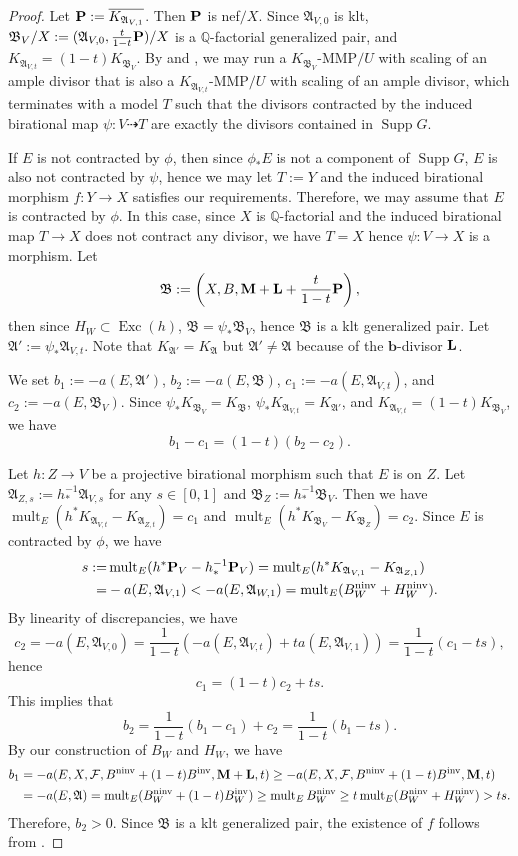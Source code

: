 \documentclass[12pt]{amsart}
\numberwithin{equation}{section}
\newcommand{\bb}{\bm{b}}
\newcommand{\Mm}{{\bf{M}}}
\newcommand{\Pp}{{\bf{P}}}
\newcommand{\Exc}{\operatorname{Exc}}
\newcommand{\ninv}{\operatorname{ninv}}
\newcommand{\inv}{\operatorname{inv}}
\newcommand{\Supp}{\operatorname{Supp}}
\newcommand{\mult}{\operatorname{mult}}
\newcommand{\Aa}{{\mathfrak{A}}}
\newcommand{\Bb}{{\mathfrak{B}}}
\newcommand{\Ff}{\mathcal{F}}
\newcommand{\Ll}{{\bf{L}}}
\theoremstyle{definition}
\theoremstyle{definition}
\theoremstyle{definition}
\begin{document}
\begin{proof}
Let $\Pp:=\overline{K_{\Aa_{V,1}}}$. Then $\Pp$ is nef$/X$. Since $\Aa_{V,0}$ is klt, $\Bb_{V}/X:=(\Aa_{V,0},\frac{t}{1-t}\Pp)/X$ is a $\mathbb Q$-factorial generalized pair, and $K_{\Aa_{V,t}}=(1-t)K_{\Bb_V}.$ By \cite[Lemma 4.4]{BZ16} and \cite[Lemma 3.3]{Bir12}, we may run a $K_{\Bb_V}$-MMP$/U$ with scaling of an ample divisor that is also a $K_{\Aa_{V,t}}$-MMP$/U$ with scaling of an ample divisor, which terminates with a model $T$ such that the divisors contracted by the induced birational map $\psi: V\dashrightarrow T$ are exactly the divisors contained in $\Supp G$.

If $E$ is not contracted by $\phi$, then since $\phi_*E$ is not a component of $\Supp G$, $E$ is also not contracted by $\psi$, hence we may let $T:=Y$ and the induced birational morphism $f: Y\rightarrow X$ satisfies our requirements. Therefore, we may assume that $E$ is contracted by $\phi$. In this case, since $X$ is $\mathbb Q$-factorial and the induced birational map $T\rightarrow X$ does not contract 
any divisor, we have $T=X$ hence $\psi: V\rightarrow X$ is a morphism. Let
$$\Bb:=\left(X,B,\Mm+\Ll+\frac{t}{1-t}\Pp\right),$$
then since $H_W\subset\Exc(h)$, $\Bb=\psi_*\Bb_V$, hence $\Bb$ is a klt generalized pair. Let $\Aa':=\psi_*\Aa_{V,t}$. Note that $K_{\Aa'}=K_{\Aa}$ but $\Aa'\not=\Aa$ because of the $\bb$-divisor $\Ll$.


We set $b_1:=-a(E,\Aa')$, $b_2:=-a(E,\Bb)$, $c_1:=-a(E,\Aa_{V,t})$, and $c_2:=-a(E,\Bb_V)$. Since $\psi_*K_{\Bb_V}=K_{\Bb}$, $\psi_*K_{\Aa_{V,t}}=K_{\Aa'}$, and $K_{\Aa_{V,t}}=(1-t)K_{\Bb_V}$, we have
$$b_1-c_1=(1-t)(b_2-c_2).$$

Let $h: Z\rightarrow V$ be a projective birational morphism such that $E$ is on $Z$. Let $\Aa_{Z,s}:=h^{-1}_*\Aa_{V,s}$ for any $s\in [0,1]$ and $\Bb_Z:=h^{-1}_*\Bb_V$.
Then we have $\mult_E(h^*K_{\Aa_{V,t}}-K_{\Aa_{Z,t}})=c_1$ and $\mult_E(h^*K_{\Bb_V}-K_{\Bb_Z})=c_2$.  Since $E$ is contracted by $\phi$, we have
\begin{align*}
s:=&\mult_E(h^*\Pp_V-h^{-1}_*\Pp_V)=\mult_E(h^*K_{\Aa_{V,1}}-K_{\Aa_{Z,1}})\\
=&-a(E,\Aa_{V,1})<-a(E,\Aa_{W,1})=\mult_E(B_W^{\ninv}+H_W^{\ninv}).
\end{align*}
By linearity of discrepancies, we have
$$c_2=-a(E,\Aa_{V,0})=\frac{1}{1-t}(-a(E,\Aa_{V,t})+ta(E,\Aa_{V,1}))=\frac{1}{1-t}(c_1-ts),$$
hence
$$c_1=(1-t)c_2+ts.$$
This implies that
$$b_2=\frac{1}{1-t}(b_1-c_1)+c_2=\frac{1}{1-t}(b_1-ts).$$
By our construction of $B_W$ and $H_W$, we have
\begin{align*}
   b_1&=-a(E,X,\Ff,B^{\ninv}+(1-t)B^{\inv},\Mm+\Ll,t)\geq-a(E,X,\Ff,B^{\ninv}+(1-t)B^{\inv},\Mm,t)\\
   &=-a(E,\Aa)=\mult_E(B_W^{\ninv}+(1-t)B_W^{\inv})\geq\mult_EB_W^{\ninv}\geq t\mult_E(B_W^{\ninv}+H_W^{\ninv})>ts.
\end{align*}
Therefore, $b_2>0$. Since $\Bb$ is a klt generalized pair, the existence of $f$ follows from \cite[Lemma 4.6]{BZ16}.
\end{proof}
\end{document}
